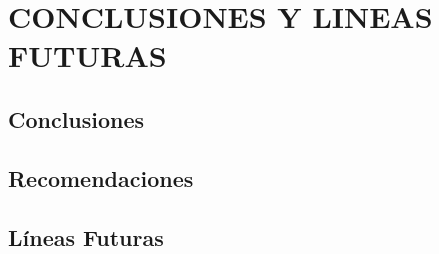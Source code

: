 \chapter{CONCLUSIONES Y LINEAS FUTURAS}
\thispagestyle{empty}


\section{Conclusiones}

\section{Recomendaciones}

\section{L\'ineas Futuras}
